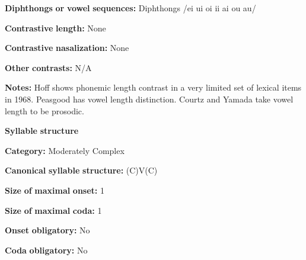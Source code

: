 \begin{styleBody}
\textbf{Diphthongs} \textbf{or} \textbf{vowel} \textbf{sequences:} Diphthongs /ei ui oi ii ai ou au/
\end{styleBody}

\begin{styleBody}
\textbf{Contrastive} \textbf{length:} None
\end{styleBody}

\begin{styleBody}
\textbf{Contrastive} \textbf{nasalization:} None
\end{styleBody}

\begin{styleBody}
\textbf{Other} \textbf{contrasts:} N/A
\end{styleBody}

\begin{styleBody}
\textbf{Notes:} Hoff shows phonemic length contrast in a very limited set of lexical items in 1968. Peasgood has vowel length distinction. Courtz and Yamada take vowel length to be prosodic.
\end{styleBody}

\begin{styleBody}
\textbf{Syllable} \textbf{structure}
\end{styleBody}

\begin{styleBody}
\textbf{Category:} Moderately Complex
\end{styleBody}

\begin{styleBody}
\textbf{Canonical} \textbf{syllable} \textbf{structure:} (C)V(C) \citep[22-7]{Courtz2008}
\end{styleBody}

\begin{styleBody}
\textbf{Size} \textbf{of} \textbf{maximal} \textbf{onset:} 1
\end{styleBody}

\begin{styleBody}
\textbf{Size} \textbf{of} \textbf{maximal} \textbf{coda:} 1
\end{styleBody}

\begin{styleBody}
\textbf{Onset} \textbf{obligatory:} No
\end{styleBody}

\begin{styleBody}
\textbf{Coda} \textbf{obligatory:} No
\end{styleBody}

